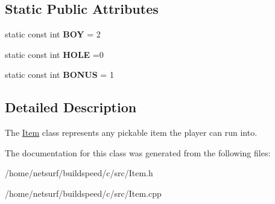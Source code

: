 \subsection*{Static Public Attributes}
\begin{DoxyCompactItemize}
\item 
static const int {\bfseries B\+OY} = 2\hypertarget{class_item_a70873a5ab783160390c311623837b5a5}{}\label{class_item_a70873a5ab783160390c311623837b5a5}

\item 
static const int {\bfseries H\+O\+LE} =0\hypertarget{class_item_abd114fce352b909292f0cf6dc89b4487}{}\label{class_item_abd114fce352b909292f0cf6dc89b4487}

\item 
static const int {\bfseries B\+O\+N\+US} = 1\hypertarget{class_item_a76b7a450081315e261c475736dfb74a3}{}\label{class_item_a76b7a450081315e261c475736dfb74a3}

\end{DoxyCompactItemize}


\subsection{Detailed Description}
The \hyperlink{class_item}{Item} class represents any pickable item the player can run into. 

The documentation for this class was generated from the following files\+:\begin{DoxyCompactItemize}
\item 
/home/netsurf/buildspeed/c/src/Item.\+h\item 
/home/netsurf/buildspeed/c/src/Item.\+cpp\end{DoxyCompactItemize}
